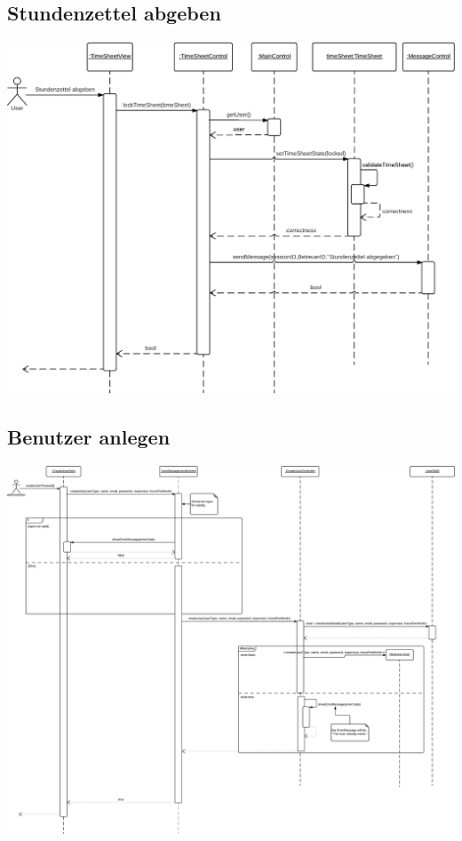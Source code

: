     \subsection{Stundenzettel abgeben}
        \includegraphics[width=\linewidth]{"Diagramms/sequenzes/send_in_timesheet.pdf"}\\
    \subsection{Benutzer anlegen}
        \includegraphics[width=\linewidth]{"Diagramms/sequenzes/create_user.pdf"}\\
